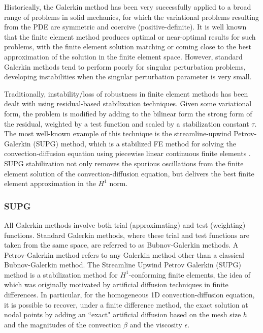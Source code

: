 Historically, the Galerkin method has been very successfully applied to a broad range of problems in solid mechanics, for which the variational problems resulting from the PDE are symmetric and coercive (positive-definite). It is well known that the finite element method produces optimal or near-optimal results for such problems, with the finite element solution matching or coming close to the best approximation of the solution in the finite element space. However, standard Galerkin methods tend to perform poorly for singular perturbation problems, developing instabilities when the singular perturbation parameter is very small. 

Traditionally, instability/loss of robustness in finite element methods has been dealt with using residual-based stabilization techniques.  Given some variational form, the problem is modified by adding to the bilinear form the strong form of the residual, weighted by a test function and scaled by a stabilization constant $\tau$.  The most well-known example of this technique is the streamline-upwind Petrov-Galerkin (SUPG) method, which is a stabilized FE method for solving the convection-diffusion equation using piecewise linear continuous finite elements \cite{SUPG}.  SUPG stabilization not only removes the spurious oscillations from the finite element solution of the convection-diffusion equation, but delivers the best finite element approximation in the $H^1$ norm.  

\subsubsection{SUPG}

All Galerkin methods involve both trial (approximating) and test (weighting) functions.   Standard Galerkin methods, where these trial and test functions are taken from the same space, are referred to as Bubnov-Galerkin methods.  A Petrov-Galerkin method refers to any Galerkin method other than a classical Bubnov-Galerkin method.  The Streamline Upwind Petrov Galerkin (SUPG) method is a stabilization method for $H^1$-conforming finite elements, the idea of which was originally motivated by artificial diffusion techniques in finite differences.  In particular, for the homogeneous 1D convection-diffusion equation, it is possible to recover, under a finite difference method, the exact solution at nodal points by adding an ``exact" artificial diffusion based on the mesh size $h$ and the magnitudes of the convection $\beta$ and the viscosity $\epsilon$.  

